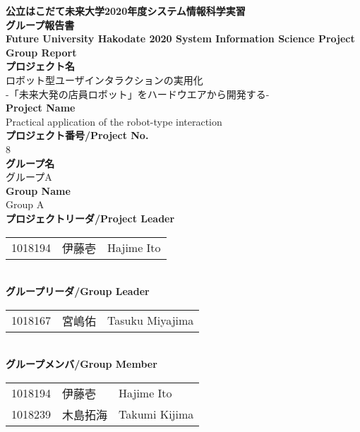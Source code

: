 \thispagestyle{plain}
\begin{titlepage}
\begin{center}
{\LARGE\bf 公立はこだて未来大学2020年度システム情報科学実習
\\ グループ報告書}
\vspace{5mm}\\
{\Large\bf Future University Hakodate 2020 System Information Science Project Group Report}
\vspace{5mm} \\
{\Large\bf プロジェクト名}\\
{\Large ロボット型ユーザインタラクションの実用化\\-「未来大発の店員ロボット」をハードウエアから開発する-}
\vspace{2mm}\\
{\Large\bf Project Name}\\
{\Large Practical application of the robot-type interaction}
\vspace{5mm} \\
{\large\bf プロジェクト番号/Project No.}\\
{\large 8}
\vspace{3mm} \\
{\large\bf グループ名}\\
{\large グループA}
\vspace{2mm} \\
{\large\bf Group Name}\\
{\large Group A}
\vspace{5mm} \\
{\large\bf プロジェクトリーダ/Project Leader}\\
\begin{tabular}{lll}
1018194 & 伊藤壱 & Hajime Ito\\
\end{tabular}
\vspace{5mm} \\
{\large\bf グループリーダ/Group Leader}\\
\begin{tabular}{lll}
1018167 & 宮嶋佑 & Tasuku Miyajima\\
\end{tabular}
\vspace{5mm} \\
{\large\bf グループメンバ/Group Member}\\
\begin{tabular}{lll}
1018194 & 伊藤壱 & Hajime Ito\\
1018239 & 木島拓海 & Takumi Kijima\\

\end{tabular}
\end{center}
\end{titlepage}
